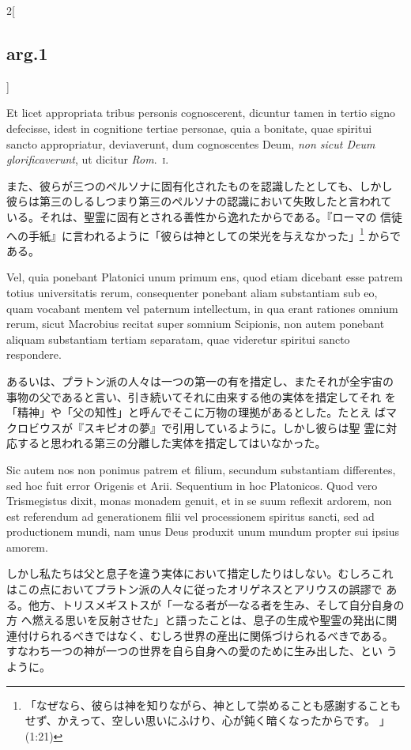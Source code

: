 \documentclass[paper=a4paper,fontsize=10pt,jafontsize=9pt,titlepage]{jlreq}
\begin{document}
\begin{paracol}{2}[\subsection{arg.1}]
\switchcolumn*

Et licet appropriata tribus personis
cognoscerent, dicuntur tamen in tertio signo defecisse, idest in
cognitione tertiae personae, quia a bonitate, quae spiritui sancto
appropriatur, deviaverunt, dum cognoscentes Deum, {\itshape non sicut Deum
glorificaverunt}, ut dicitur {\itshape Rom}.~{\scshape i}.

\switchcolumn

また、彼らが三つのペルソナに固有化されたものを認識したとしても、しかし
彼らは第三のしるしつまり第三のペルソナの認識において失敗したと言われて
 いる。それは、聖霊に固有とされる善性から逸れたからである。『ローマの
 信徒への手紙』に言われるように「彼らは神としての栄光を与えなかった」\footnote{「なぜなら、彼らは神を知りながら、神として崇めることも感謝することもせず、かえって、空しい思いにふけり、心が鈍く暗くなったからです。 」(1:21)}
 からである。

\switchcolumn*

Vel, quia ponebant Platonici unum
primum ens, quod etiam dicebant esse patrem totius universitatis
rerum, consequenter ponebant aliam substantiam sub eo, quam vocabant
mentem vel paternum intellectum, in qua erant rationes omnium rerum,
sicut Macrobius recitat super somnium Scipionis, non autem ponebant
aliquam substantiam tertiam separatam, quae videretur spiritui sancto
respondere.

\switchcolumn

あるいは、プラトン派の人々は一つの第一の有を措定し、またそれが全宇宙の
 事物の父であると言い、引き続いてそれに由来する他の実体を措定してそれ
 を「精神」や「父の知性」と呼んでそこに万物の理拠があるとした。たとえ
 ばマクロビウスが『スキピオの夢』で引用しているように。しかし彼らは聖
 霊に対応すると思われる第三の分離した実体を措定してはいなかった。

\switchcolumn*

Sic autem nos non ponimus patrem et filium, secundum
substantiam differentes, sed hoc fuit error Origenis et
Arii. Sequentium in hoc Platonicos. Quod vero Trismegistus dixit,
monas monadem genuit, et in se suum reflexit ardorem, non est
referendum ad generationem filii vel processionem spiritus sancti, sed
ad productionem mundi, nam unus Deus produxit unum mundum propter sui
ipsius amorem.

\switchcolumn

しかし私たちは父と息子を違う実体において措定したりはしない。むしろこれ
 はこの点においてプラトン派の人々に従ったオリゲネスとアリウスの誤謬で
 ある。他方、トリスメギストスが「一なる者が一なる者を生み、そして自分自身の方
 へ燃える思いを反射させた」と語ったことは、息子の生成や聖霊の発出に関
 連付けられるべきではなく、むしろ世界の産出に関係づけられるべきである。
 すなわち一つの神が一つの世界を自ら自身への愛のために生み出した、とい
 うように。


\end{paracol}
\end{document}
